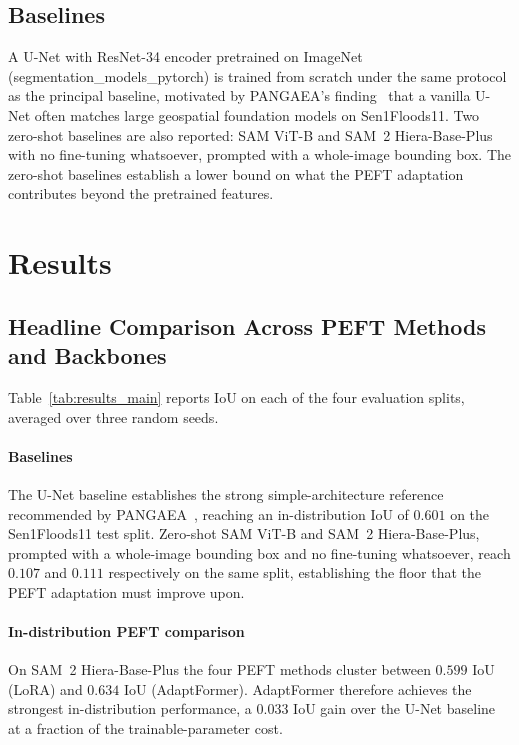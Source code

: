 \documentclass[conference]{IEEEtran}
\begin{document}
\subsection{Baselines}

A U-Net with ResNet-34 encoder pretrained on ImageNet (segmentation\_models\_pytorch) is trained from scratch under the same protocol as the principal baseline, motivated by PANGAEA's finding~\cite{Marsocci2024PANGAEA} that a vanilla U-Net often matches large geospatial foundation models on Sen1Floods11. Two zero-shot baselines are also reported: SAM ViT-B and SAM~2 Hiera-Base-Plus with no fine-tuning whatsoever, prompted with a whole-image bounding box. The zero-shot baselines establish a lower bound on what the PEFT adaptation contributes beyond the pretrained features.

\section{Results}
\label{sec:results}

\subsection{Headline Comparison Across PEFT Methods and Backbones}
\label{sec:results-headline}

Table~\ref{tab:results_main} reports IoU on each of the four evaluation splits, averaged over three random seeds.

\paragraph{Baselines}
The U-Net baseline establishes the strong simple-architecture reference recommended by PANGAEA~\cite{Marsocci2024PANGAEA}, reaching an in-distribution IoU of $0.601$ on the Sen1Floods11 test split. Zero-shot SAM ViT-B and SAM~2 Hiera-Base-Plus, prompted with a whole-image bounding box and no fine-tuning whatsoever, reach $0.107$ and $0.111$ respectively on the same split, establishing the floor that the PEFT adaptation must improve upon.

\paragraph{In-distribution PEFT comparison}
On SAM~2 Hiera-Base-Plus the four PEFT methods cluster between $0.599$ IoU (LoRA) and $0.634$ IoU (AdaptFormer). AdaptFormer therefore achieves the strongest in-distribution performance, a $0.033$ IoU gain over the U-Net baseline at a fraction of the trainable-parameter cost.
\end{document}
